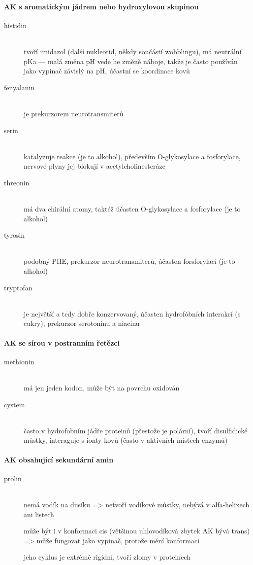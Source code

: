 \documentclass[DIV=8]{scrreprt}
\newcommand{\mybox}[2]{
    \paragraph{#1} #2
}
\begin{document}
\mybox{AK s aromatickým jádrem nebo hydroxylovou skupinou}{\begin{description}
\item[histidin]\hfill \\
tvoří imidazol (další nukleotid, někdy součástí wobblingu), má neutrální pKa --- malá změna pH vede he změně náboje, takže je často používán jako vypínač závislý na pH, účastní se koordinace kovů


\item[fenyalanin]\hfill \\
je prekurzorem neurotransmiterů


\item[serin]\hfill \\
katalyzuje reakce (je to alkohol), především O-glykosylace a fosforylace, nervové plyny jej blokují v acetylcholinesteráze


\item[threonin]\hfill \\
má dva chirální atomy, taktéž účasten O-glykosylace a fosforylace (je to alkohol)


\item[tyrosin]\hfill \\
podobný PHE, prekurzor neurotransmiterů, účasten forsforylací (je to alkohol)


\item[tryptofan]\hfill \\
je největší a tedy dobře konzervovaný, účasten hydrofóbních interakcí (s cukry), prekurzor serotoninu a niacinu

\end{description}
}


\mybox{AK se sírou v postranním řetězci}{\begin{description}
\item[methionin]\hfill \\
má jen jeden kodon, může být na povrchu oxidován


\item[cystein]\hfill \\
často v hydrofobním jádře proteinů (přestože je polární), tvoří disulfidické můstky, interaguje s ionty kovů (často v aktivních místech enzymů)

\end{description}
}


\mybox{AK obsahující sekundární amin}{\begin{description}
\item[prolin]\hfill \\
nemá vodík na dusíku => netvoří vodíkové můstky, nebývá v alfa-helixech ani listech

může být i v konformaci cis (většinou uhlovodíková zbytek AK bývá trans) => může fungovat jako vypínač, protože mění konformaci

jeho cyklus je extrémě rigidní, tvoří zlomy v proteinech

\end{description}
}
\end{document}
